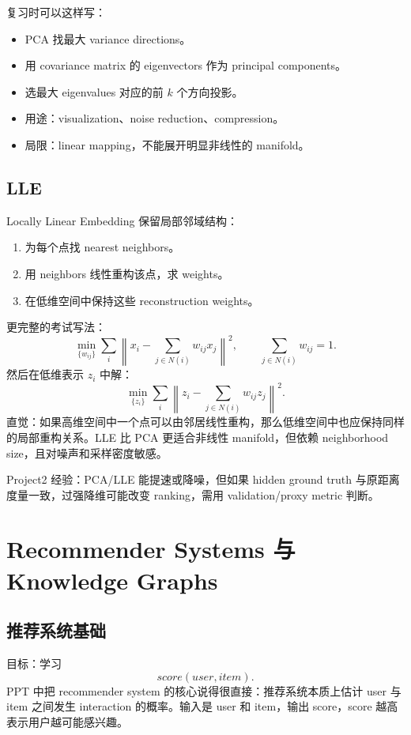 \documentclass[UTF8,11pt,a4paper]{ctexart}
\begin{document}
复习时可以这样写：
\begin{itemize}
\item PCA 找最大 variance directions。
\item 用 covariance matrix 的 eigenvectors 作为 principal components。
\item 选最大 eigenvalues 对应的前 $k$ 个方向投影。
\item 用途：visualization、noise reduction、compression。
\item 局限：linear mapping，不能展开明显非线性的 manifold。
\end{itemize}

\subsection{LLE}

Locally Linear Embedding 保留局部邻域结构：
\begin{enumerate}
\item 为每个点找 nearest neighbors。
\item 用 neighbors 线性重构该点，求 weights。
\item 在低维空间中保持这些 reconstruction weights。
\end{enumerate}

更完整的考试写法：
\[
\min_{\{w_{ij}\}}\sum_i\left\|x_i-\sum_{j\in N(i)}w_{ij}x_j\right\|^2,
\qquad \sum_{j\in N(i)}w_{ij}=1.
\]
然后在低维表示 $z_i$ 中解：
\[
\min_{\{z_i\}}\sum_i\left\|z_i-\sum_{j\in N(i)}w_{ij}z_j\right\|^2.
\]
直觉：如果高维空间中一个点可以由邻居线性重构，那么低维空间中也应保持同样的局部重构关系。LLE 比 PCA 更适合非线性 manifold，但依赖 neighborhood size，且对噪声和采样密度敏感。

Project2 经验：PCA/LLE 能提速或降噪，但如果 hidden ground truth 与原距离度量一致，过强降维可能改变 ranking，需用 validation/proxy metric 判断。

\section{Recommender Systems 与 Knowledge Graphs}

\subsection{推荐系统基础}

目标：学习
\[
score(user,item).
\]
PPT 中把 recommender system 的核心说得很直接：推荐系统本质上估计 user 与 item 之间发生 interaction 的概率。输入是 user 和 item，输出 score，score 越高表示用户越可能感兴趣。
\end{document}
